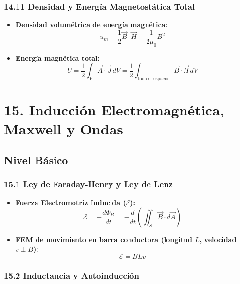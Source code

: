 \documentclass[11pt,a4paper]{article}
\begin{document}
\subsubsection*{14.11 Densidad y Energía Magnetostática Total}

\begin{itemize}
  \item \textbf{Densidad volumétrica de energía magnética:}
  \[
    u_m = \frac{1}{2} \vec{B} \cdot \vec{H} = \frac{1}{2\mu_0} B^2
  \]
  \item \textbf{Energía magnética total:}
  \[
    U = \frac{1}{2} \int_V \vec{A} \cdot \vec{J} \, dV = \frac{1}{2} \int_{\text{todo el espacio}} \vec{B} \cdot \vec{H} \, dV
  \]
\end{itemize}

\section*{15. Inducción Electromagnética, Maxwell y Ondas}

\subsection*{Nivel Básico}

\subsubsection*{15.1 Ley de Faraday-Henry y Ley de Lenz}

\begin{itemize}
  \item \textbf{Fuerza Electromotriz Inducida ($\mathcal{E}$):}
  \[
    \mathcal{E} = -\frac{d\Phi_B}{dt} = -\frac{d}{dt}\left( \iint_S \vec{B} \cdot d\vec{A} \right)
  \]
  \item \textbf{FEM de movimiento en barra conductora (longitud $L$, velocidad $v \perp B$):}
  \[
    \mathcal{E} = B L v
  \]
\end{itemize}

\subsubsection*{15.2 Inductancia y Autoinducción}
\end{document}
